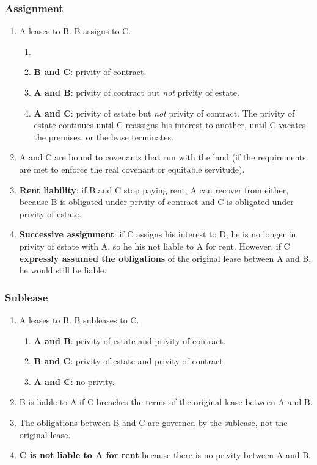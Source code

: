 \subsubsection{Assignment}

\begin{enumerate}
    \item A leases to B. B assigns to C.
    \begin{enumerate}
        \item 
        \item \textbf{B and C}: privity of contract. %
        \item \textbf{A and B}: privity of contract but \emph{not} 
        privity of estate.
        \item \textbf{A and C}: privity of estate but \emph{not} privity of 
        contract. The privity of estate continues until C reassigns his 
        interest to another, until C vacates the premises, or the lease 
        terminates.
    \end{enumerate}
    \item A and C are bound to covenants that run with the land (if the 
    requirements are met to enforce the real covenant or equitable servitude).
    \item \textbf{Rent liability}: if B and C stop paying rent, A can recover 
    from either, because B is obligated under privity of contract and C is 
    obligated under privity of estate.
    \item \textbf{Successive assignment}: if C assigns his interest to D, he 
    is no longer in privity of estate with A, so he his not liable to A for 
    rent. However, if C \textbf{expressly assumed the obligations} of the 
    original lease between A and B, he would still be liable.
\end{enumerate}

\subsubsection{Sublease}

\begin{enumerate}
    \item A leases to B. B subleases to C.
    \begin{enumerate}
        \item \textbf{A and B}: privity of estate and privity of contract.
        \item \textbf{B and C}: privity of estate and privity of contract.
        \item \textbf{A and C}: no privity.
    \end{enumerate}
    \item B is liable to A if C breaches the terms of the original lease 
    between A and B.
    \item The obligations between B and C are governed by the sublease, not 
    the original lease.
    \item \textbf{C is not liable to A for rent} because there is no privity 
    between A and B.
\end{enumerate}

